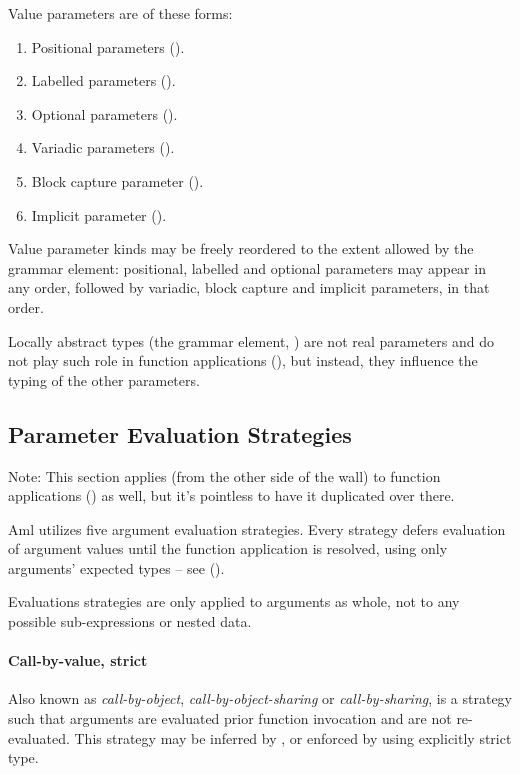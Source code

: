 Value parameters are of these forms:
\begin{enumerate}
  \item Positional parameters (). 
  \item Labelled parameters (). 
  \item Optional parameters (). 
  \item Variadic parameters ().
  \item Block capture parameter ().
  \item Implicit parameter ().
\end{enumerate}

Value parameter kinds may be freely reordered to the extent allowed by the  grammar element: positional, labelled and optional parameters may appear in any order, followed by variadic, block capture and implicit parameters, in that order. 

Locally abstract types (the  grammar element, ) are not real parameters and do not play such role in function applications (), but instead, they influence the typing of the other parameters. 





\subsection{Parameter Evaluation Strategies}
\label{sec:param-eval-strategies}

Note: This section applies (from the other side of the wall) to function applications () as well, but it's pointless to have it duplicated over there. 

Aml utilizes five argument evaluation strategies. Every strategy defers evaluation of argument values until the function application is resolved, using only arguments' expected types -- see (). 

Evaluations strategies are only applied to arguments as whole, not to any possible sub-expressions or nested data. 

\paragraph{Call-by-value, strict}
Also known as {\em call-by-object}, {\em call-by-object-sharing} or {\em call-by-sharing}, is a strategy such that arguments are evaluated prior function invocation and are not re-evaluated. This strategy may be inferred by \Aml, or enforced by using explicitly strict type.

